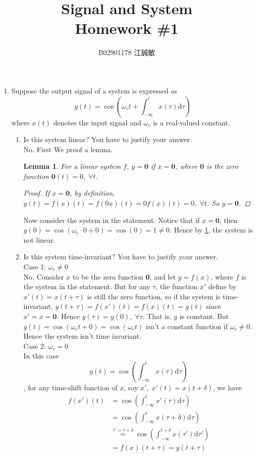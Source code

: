 \documentclass[12pt, a4paper]{article}
\title{ \bf {\Huge Signal and System}\\ Homework \#1}
\author{B02901178 江誠敏}
\newtheorem{lemma}{Lemma}
\newcommand{\dD}{\mathrm{d}}
\begin{document}
\maketitle

\begin{enumerate}
  \item Suppose the output signal of a system is expressed as
    \[ y(t) = \cos \left( \omega_c t + \int_{-\infty}^{t} x(\tau) \dD \tau \right) \]
    where $x(t)$ denotes the input signal and $\omega_c$ is a real-valued constant.
    \begin{enumerate}
      \item Is this system linear? You have to justify your answer. \\[12pt] 
        No. First We proof a lemma.
        \begin{lemma} \label{l1}
          For a linear system $f$, $y = \mathbf{0}$ if $x = \mathbf{0}$,  where
          $\mathbf{0}$ is the zero function $\mathbf{0}(t) = 0 ,\; \forall t$.
          \begin{proof}
            If $x = \mathbf{0}$, by definition, $y(t) = f(x)(t) = f(0x)(t) = 0f(x)(t) = 0, \; \forall t$.
            So $y = \mathbf{0}$.
          \end{proof}
        \end{lemma}
        Now consider the system in the statement. Notice that if $x = \mathbf{0}$, 
        then $y(0) = \cos( \omega_c \cdot 0 + 0 ) = \cos(0) = 1 \neq 0$.
        Hence by \cref{l1}, the system is not linear.
      \item Is this system time-invariant? You have to justify your answer. \\[12pt]
        Case 1: $\omega_c \neq 0$ \\
        No. Consider $x$ to be the zero function $\mathbf{0}$, and let
        $y = f(x)$, where $f$ is the system in the statement. But for any $\tau$, 
        the function $x'$ define by $x'(t) = x(t + \tau)$ is still the zero function,
        so if the system is time-invariant, $y(t+\tau) = f(x')(t) = f(x)(t) = y(t)$ since
        $x' = x = \mathbf{0}$. Hence $y(\tau) = y(0), \; \forall \tau$. That is, $y$ is
        constant. But $y(t) = \cos(\omega_c t + 0) = \cos(\omega_c t)$ isn't a constant
        function if $\omega_c \neq 0$. Hence the system isn't time invariant. \\[10pt]
        Case 2: $\omega_c = 0$ \\
        In this case \[ y(t) = \cos \left( \int_{-\infty}^{t} x(\tau) \dD \tau \right) \],
        for any time-shift function of $x$, say $x',\; x'(t) = x(t+\delta)$, we have
        \begin{align*} 
          f(x')(t) &= \cos \left( \int_{-\infty}^{t} x'(\tau) \dD \tau \right) \\
                   &= \cos \left( \int_{-\infty}^{t} x(\tau+\delta) \dD \tau \right) \\
                   &\stackrel{\tau'= \tau + \delta}{=} \cos \left( \int_{-\infty}^{t+\delta} x(\tau') \dD \tau' \right) \\
                   &= f(x)(t+\tau) = y(t+\tau)
        \end{align*}


\end{enumerate}
\end{enumerate}
\end{document}
